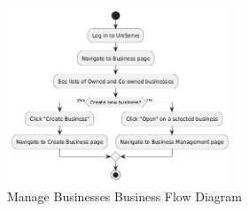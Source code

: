 \documentclass[]{VUMIFTemplateClass}
\begin{document}
\begin{figure}[H]
    \centering
    \includegraphics[width=0.6\textwidth]{docs/ps-design/design-document/images/diagrams/business/bpmn_manage_businesses.png}
    \caption{Manage Businesses Business Flow Diagram}
    \label{fig:manage_businesses_flow}
\end{figure}
\end{document}
